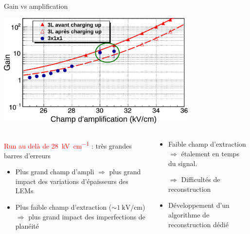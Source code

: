     \begin{frame}{Gain vs amplification}
        \begin{scriptsize}
            \centering \includegraphics[width=0.75\textwidth]{./pictures/gain_vs_ampli_circle.pdf} \\ 
            \begin{columns}
                \begin{column}{0.5\textwidth}
                    \textcolor{red}{Run au delà de \SI{28}{\kilo\volt\per\centi\meter}} : très grandes barres  d'erreurs 
                    \begin{itemize}
                        \item  Plus grand champ d'ampli $\Rightarrow$ plus grand impact des variations d'épaisseurs des LEMs
                         \item Plus faible champ d'extraction ($\sim \SI{1}{\kilo\volt\per\centi\meter}$) $\Rightarrow$ plus grand impact des imperfections de planéité
                    \end{itemize}
                \end{column}
                \begin{column}{0.5\textwidth}
                    \begin{itemize}
                        \item Faible champ d'extraction $\Rightarrow$ étalement en temps du signal.
                        \item[$\Rightarrow$] Difficultés de reconstruction
                        \item Développement d'un algorithme de reconstruction dédié
                    \end{itemize}
                \end{column}
            \end{columns}
        \end{scriptsize}
    \end{frame}
    
